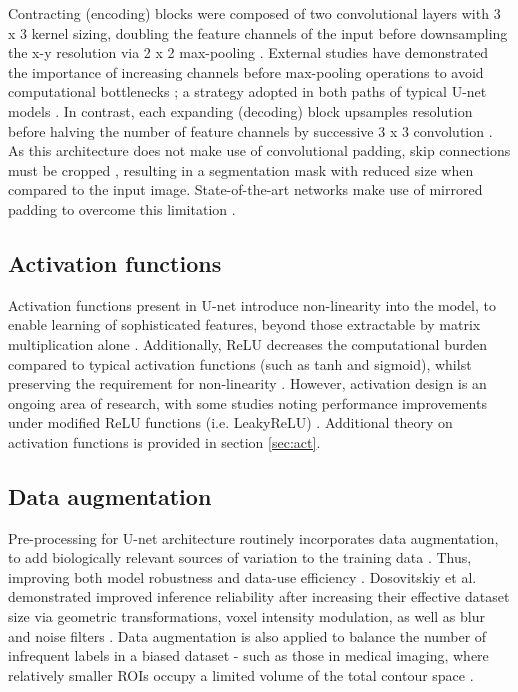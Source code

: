 Contracting (encoding) blocks were composed of two convolutional layers with 3 x 3 kernel sizing, doubling the feature channels of the input before downsampling the x-y resolution via 2 x 2 max-pooling \cite{Ronneberger_2015}. External studies have demonstrated the importance of increasing channels before max-pooling operations to avoid computational bottlenecks \cite{szegedy2015}; a strategy adopted in both paths of typical U-net models \cite{szegedy2015}. In contrast, each expanding (decoding) block upsamples resolution before halving the number of feature channels by successive  3 x 3 convolution \cite{Ronneberger_2015}. As this architecture does not make use of convolutional padding, skip connections must be cropped \cite{Ronneberger_2015}, resulting in a segmentation mask with reduced size when compared to the input image. State-of-the-art networks make use of mirrored padding to overcome this limitation \cite{Nikolov_2018}.

\subsection{Activation functions}

Activation functions present in U-net introduce non-linearity into the model, to enable learning of sophisticated features, beyond those extractable by matrix multiplication alone \cite{Maier2019}. Additionally, ReLU decreases the computational burden compared to typical activation functions (such as tanh and sigmoid), whilst preserving the requirement for non-linearity \cite{Chigozie2018}. However, activation design is an ongoing area of research, with some studies noting performance improvements under modified ReLU functions (i.e. LeakyReLU) \cite{Lin2018}. Additional theory on activation functions is provided in section \ref{sec:act}.

\subsection{Data augmentation}

Pre-processing for U-net architecture routinely incorporates data augmentation, to add biologically relevant sources of variation to the training data \cite{Maier2019, Hesamian2019, Lundervold2019}. Thus, improving both model robustness and data-use efficiency \cite{Ronneberger_2015}. Dosovitskiy et al. demonstrated improved inference reliability after increasing their effective dataset size via geometric transformations, voxel intensity modulation, as well as blur and noise filters \cite{Dosovitskiy2014}. Data augmentation is also applied to balance the number of infrequent labels in a biased dataset \cite{Maier2019} - such as those in medical imaging, where relatively smaller ROIs occupy a limited volume of the total contour space \cite{Khan2019}. 



